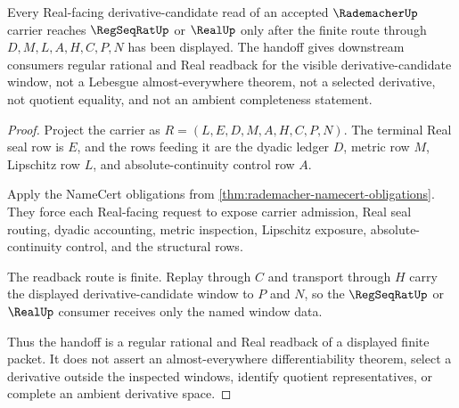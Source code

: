 \begin{theorem}
\label{thm:rademacher-real-derivative-handoff}
Every Real-facing derivative-candidate read of an accepted $\RademacherUp$ carrier reaches $\RegSeqRatUp$ or $\RealUp$ only after the finite route through $D,M,L,A,H,C,P,N$ has been displayed. The handoff gives downstream consumers regular rational and Real readback for the visible derivative-candidate window, not a Lebesgue almost-everywhere theorem, not a selected derivative, not quotient equality, and not an ambient completeness statement.
\end{theorem}
\begin{proof}
Project the carrier as $R=(L,E,D,M,A,H,C,P,N)$. The terminal Real seal row is $E$, and the rows feeding it are the dyadic ledger $D$, metric row $M$, Lipschitz row $L$, and absolute-continuity control row $A$.

Apply the NameCert obligations from \autoref{thm:rademacher-namecert-obligations}. They force each Real-facing request to expose carrier admission, Real seal routing, dyadic accounting, metric inspection, Lipschitz exposure, absolute-continuity control, and the structural rows.

The readback route is finite. Replay through $C$ and transport through $H$ carry the displayed derivative-candidate window to $P$ and $N$, so the $\RegSeqRatUp$ or $\RealUp$ consumer receives only the named window data.

Thus the handoff is a regular rational and Real readback of a displayed finite packet. It does not assert an almost-everywhere differentiability theorem, select a derivative outside the inspected windows, identify quotient representatives, or complete an ambient derivative space.
\end{proof}


